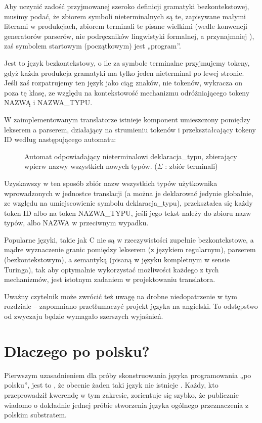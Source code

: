 Aby uczynić zadość przyjmowanej szeroko definicji gramatyki bezkontekstowej\cite[str.~158]{hopcroft_automaty}, musimy podać, że zbiorem symboli nieterminalnych są te, zapisywane małymi literami w produkcjach, zbiorem terminali te pisane wielkimi (wedle konwencji generatorów parserów, nie podręczników lingwistyki formalnej, a przynajmniej \cite{hopcroft_automaty}), zaś symbolem startowym (początkowym) jest „program”. 

Jest to język bezkontekstowy, o ile za symbole terminalne przyjmujemy tokeny, gdyż każda produkcja gramatyki ma tylko jeden nieterminal po lewej stronie. Jeśli zaś rozpatrujemy ten język jako ciąg znaków, nie tokenów, wykracza on poza tę klasę, ze względu na kontekstowość mechanizmu odróżniającego tokeny NAZWĄ i NAZWA\_TYPU.

W zaimplementowanym translatorze istnieje komponent umieszczony pomiędzy lekserem a parserem, działający na strumieniu tokenów i przekształcający tokeny ID według następującego automatu:

\begin{figure}[h]
    \centering
    
    \caption{Automat odpowiadający nieterminalowi deklaracja\_typu, zbierający wpierw nazwy wszystkich nowych typów. ($\Sigma$ : zbiór terminali) }
\end{figure}
Uzyskawszy w ten sposób zbiór nazw wszystkich typów użytkownika wprowadzonych w jednostce translacji (a można je deklarować jedynie globalnie, ze względu na umiejscowienie symbolu deklaracja\_typu), przekształca się każdy token ID albo na token NAZWA\_TYPU, jeśli jego tekst należy do zbioru nazw typów, albo NAZWA w przeciwnym wypadku.

Popularne języki, takie jak C nie są w rzeczywistości zupełnie bezkontekstowe, a mądre wyznaczenie granic pomiędzy lekserem (z językiem regularnym), parserem (bezkontekstowym), a semantyką (pisaną w języku kompletnym w sensie Turinga), tak aby optymalnie wykorzystać możliwości każdego z tych mechanizmów, jest istotnym zadaniem w projektowaniu translatora.\cite{DRAGON_BOOK}

Uważny czytelnik może zwrócić też uwagę na drobne niedopatrzenie w tym rozdziale – zapomniano  przetłumaczyć projekt języka na angielski. To odstępstwo od zwyczaju będzie wymagało szerszych wyjaśnień.

\section{Dlaczego po polsku?}
Pierwszym uzasadnieniem dla próby skonstruowania języka programowania „po polsku”, jest to , że obecnie żaden taki język nie istnieje . Każdy, kto przeprowadził kwerendę w tym zakresie, zorientuje się szybko, że publicznie wiadomo o dokładnie jednej próbie stworzenia języka ogólnego przeznaczenia z polskim substratem.%

